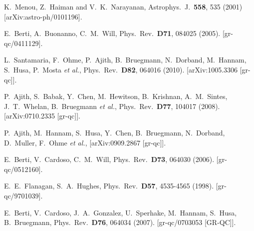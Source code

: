 \documentclass{iopart}
\begin{document}
\begin{thebibliography}{}
  K.~Menou, Z.~Haiman and V.~K.~Narayanan,
  Astrophys.\ J.\  {\bf 558}, 535 (2001)
  [arXiv:astro-ph/0101196].

  E.~Berti, A.~Buonanno, C.~M.~Will,
  Phys.\ Rev.\  {\bf D71}, 084025 (2005).
  [gr-qc/0411129].

  L.~Santamaria, F.~Ohme, P.~Ajith, B.~Bruegmann, N.~Dorband, M.~Hannam, S.~Husa, P.~Mosta {\it et al.},
  Phys.\ Rev.\  {\bf D82}, 064016 (2010).
  [arXiv:1005.3306 [gr-qc]].



  P.~Ajith, S.~Babak, Y.~Chen, M.~Hewitson, B.~Krishnan, A.~M.~Sintes, J.~T.~Whelan, B.~Bruegmann {\it et al.},
  Phys.\ Rev.\  {\bf D77}, 104017 (2008).
  [arXiv:0710.2335 [gr-qc]].

  P.~Ajith, M.~Hannam, S.~Husa, Y.~Chen, B.~Bruegmann, N.~Dorband, D.~Muller, F.~Ohme {\it et al.},
  [arXiv:0909.2867 [gr-qc]].

  E.~Berti, V.~Cardoso, C.~M.~Will,
  Phys.\ Rev.\  {\bf D73}, 064030 (2006).
  [gr-qc/0512160].

  E.~E.~Flanagan, S.~A.~Hughes,
  Phys.\ Rev.\  {\bf D57}, 4535-4565 (1998).
  [gr-qc/9701039].

  E.~Berti, V.~Cardoso, J.~A.~Gonzalez, U.~Sperhake, M.~Hannam, S.~Husa, B.~Bruegmann,
  Phys.\ Rev.\  {\bf D76}, 064034 (2007).
  [gr-qc/0703053 [GR-QC]].

\end{thebibliography}{}
\end{document}

